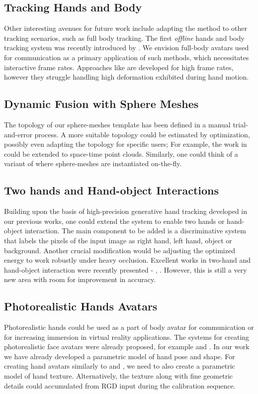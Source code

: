 \subsection*{Tracking Hands and Body}
Other interesting avenues for future work include adapting the method to other tracking scenarios, such as full body tracking. The first \textit{offline} hands and body tracking system was recently introduced by \cite{romero2017embodied}. We envision full-body avatars used for communication as a primary application of such methods, which necessitates interactive frame rates. Approaches like \cite{ dou2017motion2fusion} are developed for high frame rates, however they struggle handling high deformation exhibited during hand motion.

\subsection*{Dynamic Fusion with Sphere Meshes}
The topology of our sphere-meshes template has been defined in a manual trial-and-error process. A more suitable topology could be estimated by optimization, possibly even adapting the topology for specific users; For example, the work in \cite{thiery2016spheremesh} could be extended to space-time point clouds. Similarly, one could think of a variant of \cite{newcombe2015dynfusion} where sphere-meshes are instantiated on-the-fly. 

\subsection*{Two hands and Hand-object Interactions}
Building upon the basis of high-precision generative hand tracking developed in our previous works, one could extend the system to enable two hands or hand-object interaction. The main component to be added is a discriminative system that labels the pixels of the input image as right hand, left hand, object or background. Another crucial modification would be adjusting the optimized energy to work robustly under heavy occlusion. Excellent works in two-hand and hand-object interaction were recently presented -  \cite{taylor2017articulated}, \cite{mueller2017real}. However, this is still a very new area with room for improvement in accuracy.

\subsection*{Photorealistic Hands Avatars}
Photorealistic hands could be used as a part of body avatar for communication or for increasing immersion in virtual reality applications. The systems for creating photorealistic face avatars were already proposed, for example \cite{thies2016face2face} and \cite{tewari2017mofa}. In our work we have already developed a parametric model of hand pose and shape. For creating hand avatars similarly to\cite{thies2016face2face} and \cite{tewari2017mofa}, we need to also create a parametric model of hand texture. Alternatively, the texture along with fine geometric details could accumulated from RGD input during the calibration sequence.

